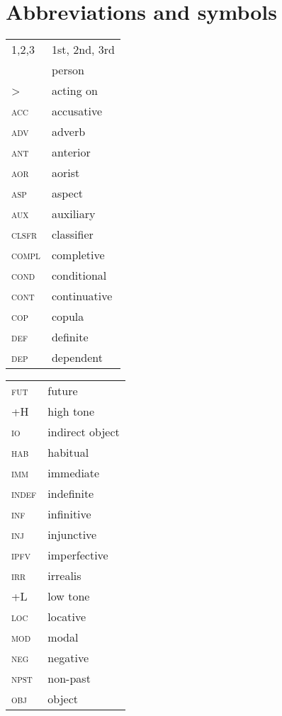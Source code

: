 \documentclass[output=paper]{langsci/langscibook}
\begin{document}
\section*{Abbreviations and symbols}

 

\begin{tabularx}{.3\textwidth}{ll}
1,2,3 & 1st, 2nd, 3rd\\
& person\\
>  & acting on  \\
\textsc{acc}  & accusative\\  
\textsc{adv}   & adverb\\
\textsc{ant}   & anterior \\
\textsc{aor}   & aorist\\  
\textsc{asp}   & aspect\\
\textsc{aux}   & auxiliary  \\
\textsc{clsfr}   & classifier  \\
\textsc{compl}   & completive\\
\textsc{cond}   & conditional  \\
\textsc{cont}   & continuative  \\
\textsc{cop}   & copula\\
\textsc{def}   & definite\\  
\textsc{dep}   & dependent \\
\end{tabularx} 
\begin{tabularx}{.3\textwidth}{ll}
\textsc{fut}   & future\\
\textsc{+H}   & high tone\\ 
\textsc{io}  & indirect object  \\
\textsc{hab}   & habitual  \\
\textsc{imm}  & immediate\\
\textsc{indef}  & indefinite\\  
\textsc{inf}  & infinitive  \\
\textsc{inj}  & injunctive  \\
\textsc{ipfv}  & imperfective  \\
\textsc{irr}   & irrealis  \\
\textsc{+L}  & low tone  \\
\textsc{loc}  & locative  \\
\textsc{mod}  & modal  \\
\textsc{neg}  & negative  \\
\textsc{npst}  & non-past \\
\textsc{obj}  & object  \\
\end{tabularx} 
\end{document}
